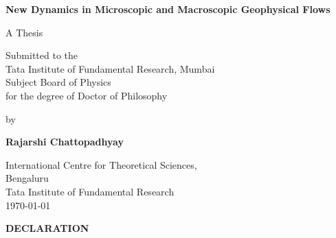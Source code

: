 


\begin{titlepage}
    \centering
    \thispagestyle{empty}
    
    \vspace*{1.2cm}
    
    {\Huge\bfseries
    New Dynamics in Microscopic and Macroscopic Geophysical Flows\par}
    
    \vspace{3.5cm}
    
    {\large A Thesis\par}
    
    \vspace{2.5cm}
    
    {\large
    Submitted to the\\[0.2em]
    Tata Institute of Fundamental Research, Mumbai\\[0.2em]
    Subject Board of Physics\\[0.2em]
    for the degree of Doctor of Philosophy\par}
    
    \vspace{1.5cm}
    
    {\large by\par}
    
    \vspace{1cm}
    
    {\large\bfseries Rajarshi Chattopadhyay\par}
    
    \vfill
    
    {\large
    International Centre for Theoretical Sciences,\\[0.2em]
    Bengaluru\\[0.2em]
    Tata Institute of Fundamental Research\\[0.2em]
    \today \par}
    
    \vspace{1.5cm}
    
  \end{titlepage}
  \clearpage
  \thispagestyle{empty}
  \begin{center}
  {\LARGE\bfseries DECLARATION\par}
  \end{center}
  
